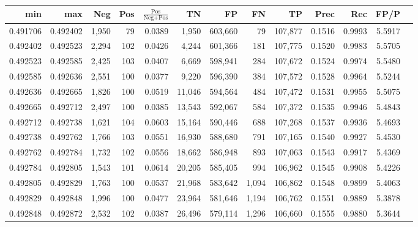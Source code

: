 \begin{tabular}{rrrrrrrrrrrrr}
\toprule
     min &      max &   Neg & Pos & $\frac{\text{Pos}}{\text{Neg}+\text{Pos}}$ &      TN &      FP &      FN &      TP &   Prec &    Rec &   FP/P \\
\midrule
0.491706 & 0.492402 & 1,950 &  79 &                                     0.0389 &   1,950 & 603,660 &      79 & 107,877 & 0.1516 & 0.9993 & 5.5917 \\
0.492402 & 0.492523 & 2,294 & 102 &                                     0.0426 &   4,244 & 601,366 &     181 & 107,775 & 0.1520 & 0.9983 & 5.5705 \\
0.492523 & 0.492585 & 2,425 & 103 &                                     0.0407 &   6,669 & 598,941 &     284 & 107,672 & 0.1524 & 0.9974 & 5.5480 \\
0.492585 & 0.492636 & 2,551 & 100 &                                     0.0377 &   9,220 & 596,390 &     384 & 107,572 & 0.1528 & 0.9964 & 5.5244 \\
0.492636 & 0.492665 & 1,826 & 100 &                                     0.0519 &  11,046 & 594,564 &     484 & 107,472 & 0.1531 & 0.9955 & 5.5075 \\
0.492665 & 0.492712 & 2,497 & 100 &                                     0.0385 &  13,543 & 592,067 &     584 & 107,372 & 0.1535 & 0.9946 & 5.4843 \\
0.492712 & 0.492738 & 1,621 & 104 &                                     0.0603 &  15,164 & 590,446 &     688 & 107,268 & 0.1537 & 0.9936 & 5.4693 \\
0.492738 & 0.492762 & 1,766 & 103 &                                     0.0551 &  16,930 & 588,680 &     791 & 107,165 & 0.1540 & 0.9927 & 5.4530 \\
0.492762 & 0.492784 & 1,732 & 102 &                                     0.0556 &  18,662 & 586,948 &     893 & 107,063 & 0.1543 & 0.9917 & 5.4369 \\
0.492784 & 0.492805 & 1,543 & 101 &                                     0.0614 &  20,205 & 585,405 &     994 & 106,962 & 0.1545 & 0.9908 & 5.4226 \\
0.492805 & 0.492829 & 1,763 & 100 &                                     0.0537 &  21,968 & 583,642 &   1,094 & 106,862 & 0.1548 & 0.9899 & 5.4063 \\
0.492829 & 0.492848 & 1,996 & 100 &                                     0.0477 &  23,964 & 581,646 &   1,194 & 106,762 & 0.1551 & 0.9889 & 5.3878 \\
0.492848 & 0.492872 & 2,532 & 102 &                                     0.0387 &  26,496 & 579,114 &   1,296 & 106,660 & 0.1555 & 0.9880 & 5.3644 \\

\end{tabular}
